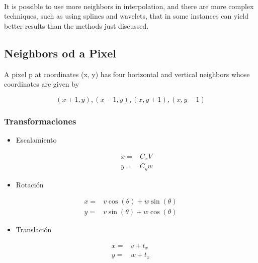 \documentclass[letterpaper,14pts]{article}
\begin{document}
    \begin{center}
    \end{center}
    { \hspace*{\fill} \\}
    
    It is possible to use more neighbors in interpolation, and there are
more complex techniques, such as using splines and wavelets, that in
some instances can yield better results than the methods just discussed.

    \subsection{Neighbors od a Pixel}\label{neighbors-od-a-pixel}

A pixel p at coordinates (x, y) has four horizontal and vertical
neighbors whose coordinates are given by

\[
(x+1,y),(x- 1,y),(x,y+1),(x,y-1)
\]

    \subsubsection{Transformaciones}\label{transformaciones}

\begin{itemize}
\itemsep1pt\parskip0pt
\item
  Escalamiento

  \begin{eqnarray}
  x=&C_{x}V \\
  y=&C_{y}w
  \end{eqnarray}
\item
  Rotación
\end{itemize}

\begin{eqnarray}
x=&v \cos (\theta)+ w\sin (\theta) \\
y=&v \sin (\theta)+ w\cos (\theta) 
\end{eqnarray}

\begin{itemize}
\itemsep1pt\parskip0pt
\item
  Translación
\end{itemize}

\begin{eqnarray}
x=&v +t_{x} \\
y=&w +t_{x}
\end{eqnarray}


    
    
    
    
\end{document}
